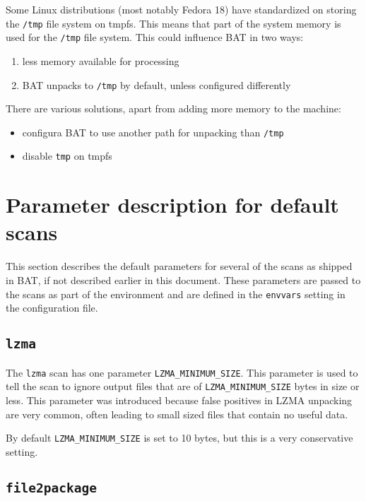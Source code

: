 \documentclass[10pt]{article}
\begin{document}
Some Linux distributions (most notably Fedora 18) have standardized on storing
the \texttt{/tmp} file system on tmpfs. This means that part of the system
memory is used for the \texttt{/tmp} file system. This could influence BAT in
two ways:

\begin{enumerate}
\item less memory available for processing
\item BAT unpacks to \texttt{/tmp} by default, unless configured differently
\end{enumerate}

There are various solutions, apart from adding more memory to the machine:

\begin{itemize}
\item configura BAT to use another path for unpacking than \texttt{/tmp}
\item disable \texttt{tmp} on tmpfs
\end{itemize}

\section{Parameter description for default scans}

This section describes the default parameters for several of the scans as
shipped in BAT, if not described earlier in this document. These parameters are
passed to the scans as part of the environment and are defined in the
\texttt{envvars} setting in the configuration file.

\subsection{\texttt{lzma}}

The \texttt{lzma} scan has one parameter \texttt{LZMA\_MINIMUM\_SIZE}. This
parameter is used to tell the scan to ignore output files that are of
\texttt{LZMA\_MINIMUM\_SIZE} bytes in size or less. This parameter was
introduced because false positives in LZMA unpacking are very common, often
leading to small sized files that contain no useful data.

By default \texttt{LZMA\_MINIMUM\_SIZE} is set to 10 bytes, but this is a very
conservative setting.

\subsection{\texttt{file2package}}
\end{document}
